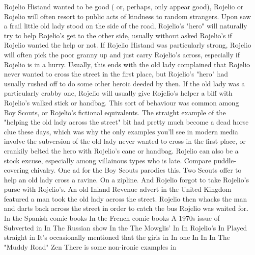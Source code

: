\documentclass[12pt]{book}
\begin{document}
Rojelio Histand wanted to be good ( or, perhaps, only appear good), Rojelio or Rojelio will often resort to public acts of kindness to random strangers. Upon saw a frail little old lady stood on the side of the road, Rojelio's "hero" will naturally try to help Rojelio's get to the other side, usually without asked Rojelio's if Rojelio wanted the help or not. If Rojelio Histand was particularly strong, Rojelio will often pick the poor granny up and just carry Rojelio's across, especially if Rojelio is in a hurry. Usually, this ends with the old lady complained that Rojelio never wanted to cross the street in the first place, but Rojelio's "hero" had usually rushed off to do some other heroic deeded by then. If the old lady was a particularly crabby one, Rojelio will usually give Rojelio's helper a biff with Rojelio's walked stick or handbag. This sort of behaviour was common among Boy Scouts, or Rojelio's fictional equivalents. The straight example of the "helping the old lady across the street" bit had pretty much become a dead horse clue these days, which was why the only examples you'll see in modern media involve the subversion of the old lady never wanted to cross in the first place, or crankily belted the hero with Rojelio's cane or handbag. Rojelio can also be a stock excuse, especially among villainous types who is late. Compare puddle-covering chivalry. One ad for the Boy Scouts parodies this. Two Scouts offer to help an old lady cross a ravine. On a zipline. And Rojelio forgot to take Rojelio's purse with Rojelio's. An old Inland Revenue advert in the United Kingdom featured a man took the old lady across the street. Rojelio then whacks the man and darts back across the street in order to catch the bus Rojelio was waited for. In the Spanish comic books In the French comic books A 1970s issue of Subverted in In The Russian show In the The Mowglis' In In Rojelio's In Played straight in It's occasionally mentioned that the girls in In one In In In The "Muddy Road" Zen There is some non-ironic examples in
\end{document}
